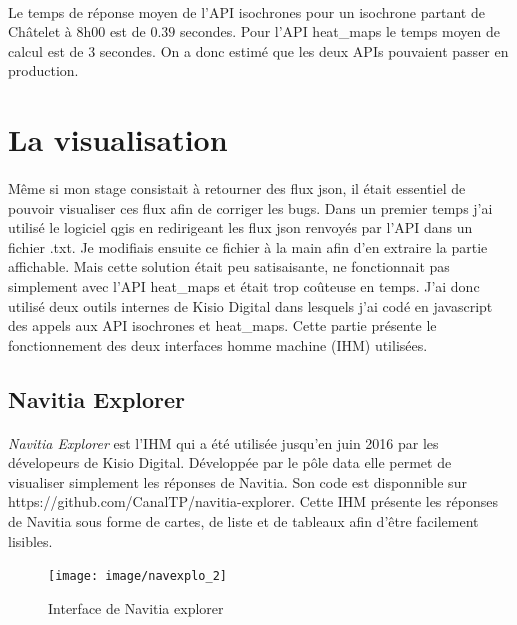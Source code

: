 \documentclass[a4paper]{report}
\begin{document}
\paragraph{} Le temps de réponse moyen de l'API isochrones pour un isochrone partant de Châtelet à 8h00 est de $0.39$ secondes.  Pour l'API heat\_maps le temps moyen de calcul est de $3$ secondes. On a donc estimé que les deux APIs pouvaient passer en production.

\section{La visualisation}

\paragraph{} Même si mon stage consistait à retourner des flux json, il était essentiel de pouvoir visualiser ces flux afin de corriger les bugs. Dans un premier temps j'ai utilisé le logiciel qgis en redirigeant les flux json renvoyés par l'API dans un fichier .txt. Je modifiais ensuite ce fichier à la main afin d'en extraire la partie affichable. Mais cette solution était peu satisaisante, ne fonctionnait pas simplement avec l'API heat\_maps et était trop coûteuse en temps. J'ai donc utilisé deux outils internes de Kisio Digital dans lesquels j'ai codé en javascript des appels aux API isochrones et heat\_maps. Cette partie présente le fonctionnement des deux interfaces homme machine (IHM) utilisées.

\subsection{Navitia Explorer}

\paragraph{} \emph{Navitia Explorer} est l'IHM qui a été utilisée jusqu'en juin 2016 par les dévelopeurs de Kisio Digital. Développée par le pôle data elle permet de visualiser simplement les réponses de Navitia. Son code est disponnible sur \color{blue} https://github.com/CanalTP/navitia-explorer\color{black}. Cette IHM présente les réponses de Navitia sous forme de cartes, de liste et de tableaux afin d'être facilement lisibles.

\begin{figure}[H]
	\begin{center}
		\texttt{[image: image/navexplo\_2]}
		\caption{Interface de Navitia explorer}
		\label{Interface de Navitia explorer}
	\end{center}
\end{figure}
\end{document}
